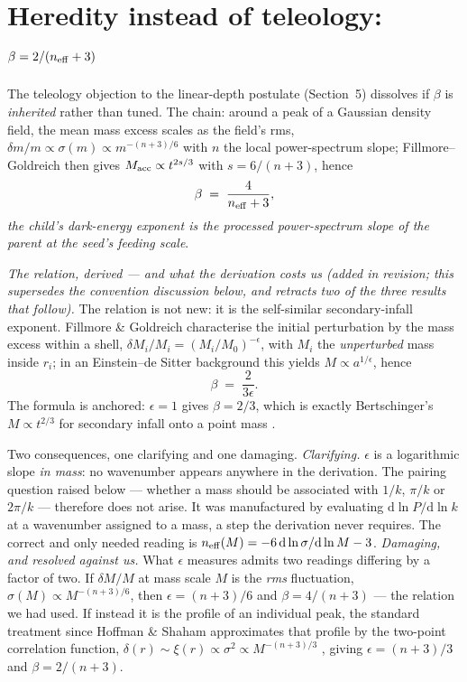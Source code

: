 \documentclass[11pt]{article}
\begin{document}
\section{Heredity instead of teleology: $\beta = 2/(n_{\rm eff}+3)$}\label{sec:heredity}
The teleology objection to the linear-depth postulate (Section~5) dissolves if $\beta$ is \emph{inherited} rather than tuned. The chain: around a peak of a Gaussian density field, the mean mass excess scales as the field's rms, $\delta m/m \propto \sigma(m) \propto m^{-(n+3)/6}$ with $n$ the local power-spectrum slope; Fillmore--Goldreich then gives $M_{\rm acc} \propto t^{2s/3}$ with $s = 6/(n+3)$, hence
\begin{equation} \beta \;=\; \frac{4}{n_{\rm eff}+3}, \end{equation}
\emph{the child's dark-energy exponent is the processed power-spectrum slope of the parent at the seed's feeding scale}.

\emph{The relation, derived --- and what the derivation costs us (added in revision; this
supersedes the convention discussion below, and retracts two of the three results that follow).}
The relation is not new: it is the self-similar secondary-infall exponent. Fillmore \&
Goldreich \cite{FG84} characterise the initial perturbation by the mass excess within a shell,
$\delta M_i/M_i = (M_i/M_0)^{-\epsilon}$, with $M_i$ the \emph{unperturbed} mass inside $r_i$; in
an Einstein--de Sitter background this yields $M \propto a^{1/\epsilon}$, hence
\begin{equation}
\beta \;=\; \frac{2}{3\epsilon}.
\end{equation}
The formula is anchored: $\epsilon = 1$ gives $\beta = 2/3$, which is exactly Bertschinger's
$M \propto t^{2/3}$ for secondary infall onto a point mass \cite{Bertschinger85}.

Two consequences, one clarifying and one damaging.
\emph{Clarifying.} $\epsilon$ is a logarithmic slope \emph{in mass}: no wavenumber appears
anywhere in the derivation. The pairing question raised below --- whether a mass should be
associated with $1/k$, $\pi/k$ or $2\pi/k$ --- therefore does not arise. It was manufactured by
evaluating $\mathrm{d}\ln P/\mathrm{d}\ln k$ at a wavenumber assigned to a mass, a step the
derivation never requires. The correct and only needed reading is
$n_{\rm eff}(M) = -6\,\mathrm{d}\ln\sigma/\mathrm{d}\ln M - 3$.
\emph{Damaging, and resolved against us.} What $\epsilon$ measures admits two readings differing
by a factor of two. If $\delta M/M$ at mass scale $M$ is the \emph{rms} fluctuation,
$\sigma(M) \propto M^{-(n+3)/6}$, then $\epsilon = (n+3)/6$ and $\beta = 4/(n+3)$ --- the relation
we had used. If instead it is the profile of an individual peak, the standard treatment since
Hoffman \& Shaham \cite{HS85} approximates that profile by the two-point correlation function,
$\delta(r) \sim \xi(r) \propto \sigma^2 \propto M^{-(n+3)/3}$ \cite{BBKS86}, giving
$\epsilon = (n+3)/3$ and $\beta = 2/(n+3)$.
\end{document}
